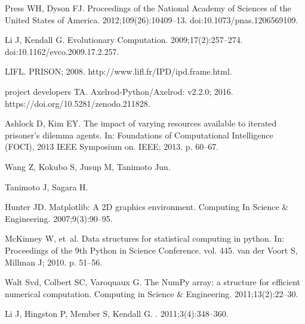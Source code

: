 \documentclass[10pt,letterpaper]{article}
\begin{document}
\begin{thebibliography}{10}
Press WH, Dyson FJ.
\newblock Proceedings of the National Academy of Sciences of the United States
  of America. 2012;109(26):10409--13.
\newblock doi:{10.1073/pnas.1206569109}.

Li J, Kendall G.
\newblock Evolutionary Computation. 2009;17(2):257--274.
\newblock doi:{10.1162/evco.2009.17.2.257}.

LIFL. PRISON; 2008.
\newblock http://www.lifl.fr/IPD/ipd.frame.html.

project developers TA. Axelrod-Python/Axelrod: v2.2.0; 2016.
\newblock https://doi.org/10.5281/zenodo.211828.

Ashlock D, Kim EY.
\newblock The impact of varying resources available to iterated prisoner's
  dilemma agents.
\newblock In: Foundations of Computational Intelligence (FOCI), 2013 IEEE
  Symposium on. IEEE; 2013. p. 60--67.

Wang Z, Kokubo S, Jusup M, Tanimoto Jun.

Tanimoto J, Sagara H.

Hunter JD.
\newblock Matplotlib: A 2D graphics environment.
\newblock Computing In Science \& Engineering. 2007;9(3):90--95.

McKinney W, et~al.
\newblock Data structures for statistical computing in python.
\newblock In: Proceedings of the 9th Python in Science Conference. vol. 445.
  van der Voort S, Millman J; 2010. p. 51--56.

Walt Svd, Colbert SC, Varoquaux G.
\newblock The NumPy array: a structure for efficient numerical computation.
\newblock Computing in Science \& Engineering. 2011;13(2):22--30.


Li J, Hingston P, Member S, Kendall G.
. 2011;3(4):348--360.


\end{thebibliography}
\end{document}
